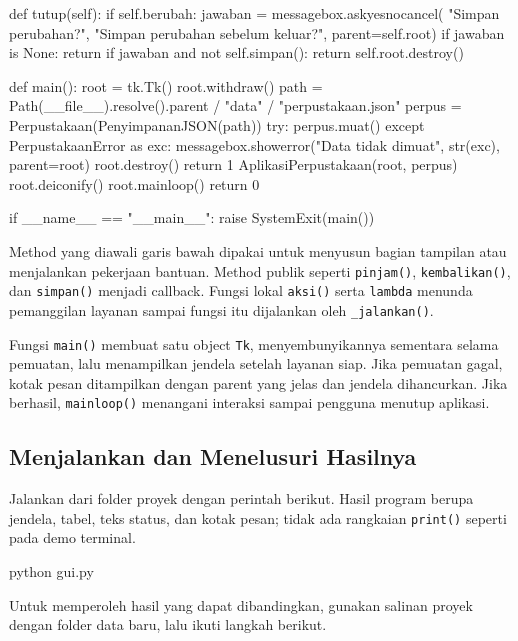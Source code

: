 \begin{kode}[gui.py]
    def tutup(self):
        if self.berubah:
            jawaban = messagebox.askyesnocancel(
                "Simpan perubahan?", "Simpan perubahan sebelum keluar?",
                parent=self.root)
            if jawaban is None:
                return
            if jawaban and not self.simpan():
                return
        self.root.destroy()


def main():
    root = tk.Tk()
    root.withdraw()
    path = Path(__file__).resolve().parent / "data" / "perpustakaan.json"
    perpus = Perpustakaan(PenyimpananJSON(path))
    try:
        perpus.muat()
    except PerpustakaanError as exc:
        messagebox.showerror("Data tidak dimuat", str(exc), parent=root)
        root.destroy()
        return 1
    AplikasiPerpustakaan(root, perpus)
    root.deiconify()
    root.mainloop()
    return 0


if __name__ == "__main__":
    raise SystemExit(main())
\end{kode}

Method yang diawali garis bawah dipakai untuk menyusun bagian tampilan atau menjalankan pekerjaan bantuan. Method publik seperti \texttt{pinjam()}, \texttt{kembalikan()}, dan \texttt{simpan()} menjadi callback. Fungsi lokal \texttt{aksi()} serta \texttt{lambda} menunda pemanggilan layanan sampai fungsi itu dijalankan oleh \texttt{\_jalankan()}.

Fungsi \texttt{main()} membuat satu object \texttt{Tk}, menyembunyikannya sementara selama pemuatan, lalu menampilkan jendela setelah layanan siap. Jika pemuatan gagal, kotak pesan ditampilkan dengan parent yang jelas dan jendela dihancurkan. Jika berhasil, \texttt{mainloop()} menangani interaksi sampai pengguna menutup aplikasi.

\subsection{Menjalankan dan Menelusuri Hasilnya}

Jalankan dari folder proyek dengan perintah berikut. Hasil program berupa jendela, tabel, teks status, dan kotak pesan; tidak ada rangkaian \texttt{print()} seperti pada demo terminal.

\begin{keluaran}
python gui.py
\end{keluaran}

Untuk memperoleh hasil yang dapat dibandingkan, gunakan salinan proyek dengan folder data baru, lalu ikuti langkah berikut.

